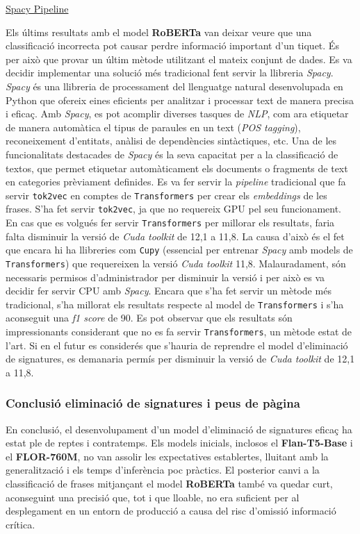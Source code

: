 \underline{Spacy Pipeline}

Els últims resultats amb el model \textbf{RoBERTa} van deixar veure que una classificació incorrecta pot causar perdre informació important d'un tiquet. És per això que provar un últim mètode utilitzant el mateix conjunt de dades. Es va decidir implementar una solució més tradicional fent servir la llibreria \textit{Spacy}.
\textit{Spacy} és una llibreria de processament del llenguatge natural desenvolupada en Python que ofereix eines eficients per analitzar i processar text de manera precisa i eficaç. Amb \textit{Spacy}, es pot acomplir diverses tasques de \textit{NLP}, com ara etiquetar de manera automàtica el tipus de paraules en un text (\textit{POS tagging}), reconeixement d'entitats, anàlisi de dependències sintàctiques, etc. Una de les funcionalitats destacades de \textit{Spacy} és la seva capacitat per a la classificació de textos, que permet etiquetar automàticament els documents o fragments de text en categories prèviament definides.
Es va fer servir la \textit{pipeline} tradicional que fa servir \texttt{tok2vec} en comptes de \texttt{Transformers} per crear els \textit{embeddings} de les frases. S'ha fet servir \texttt{tok2vec}, ja que no requereix GPU pel seu funcionament. En cas que es volgués fer servir \texttt{Transformers} per millorar els resultats, faria falta disminuir la versió de \textit{Cuda toolkit} de 12,1 a 11,8. La causa d'això és el fet que encara hi ha llibreries com \texttt{Cupy} (essencial per entrenar \textit{Spacy} amb models de \texttt{Transformers}) que requereixen la versió \textit{Cuda toolkit} 11,8. Malauradament, són necessaris permisos d'administrador per disminuir la versió i per això es va decidir fer servir CPU amb \textit{Spacy}.
Encara que s'ha fet servir un mètode més tradicional, s'ha millorat els resultats respecte al model de \texttt{Transformers} i s'ha aconseguit una \textit{f1 score} de 90. Es pot observar que els resultats són impressionants considerant que no es fa servir \texttt{Transformers}, un mètode estat de l'art. Si en el futur es considerés que s'hauria de reprendre el model d'eliminació de signatures, es demanaria permís per disminuir la versió de \textit{Cuda toolkit} de 12,1 a 11,8.

\subsubsection{Conclusió eliminació de signatures i peus de pàgina}
En conclusió, el desenvolupament d'un model d'eliminació de signatures eficaç ha estat ple de reptes i contratemps. Els models inicials, inclosos el \textbf{Flan-T5-Base} i el \textbf{FLOR-760M}, no van assolir les expectatives establertes, lluitant amb la generalització i els temps d'inferència poc pràctics. El posterior canvi a la classificació de frases mitjançant el model \textbf{RoBERTa} també va quedar curt, aconseguint una precisió que, tot i que lloable, no era suficient per al desplegament en un entorn de producció a causa del risc d'omissió informació crítica.

